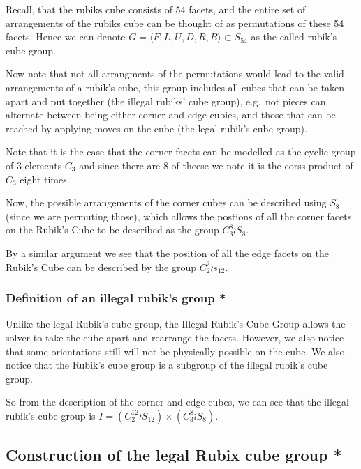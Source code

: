 Recall, that the rubiks cube consists of \(54\) facets, and the entire
set of arrangements of the rubiks cube can be thought of as permutations
of these 54 facets. Hence we can denote
\(G = \langle F,L,U,D,R,B\rangle \subset S_{54}\) as the called rubik's
cube group.

Now note that not all arrangments of the permutations would lead to the
valid arrangements of a rubik's cube, this group includes all cubes that
can be taken apart and put together (the illegal rubiks' cube group),
e.g.~not pieces can alternate between being either corner and edge
cubies, and those that can be reached by applying moves on the cube (the
legal rubik's cube group).

Note that it is the case that the corner facets can be modelled as the
cyclic group of 3 elements \(C_{3}\) and since there are 8 of theese we
note it is the corss product of \(C_{3}\) eight times.

Now, the possible arrangements of the corner cubes can be described
using \(S_{8}\) (since we are permuting those), which allows the
postions of all the corner facets on the Rubik's Cube to be described as
the group \(C_{3}^{8} \wr S_{8}\).

By a similar argument we see that the position of all the edge facets on
the Rubik's Cube can be described by the group \(C_{2}^{2} \wr s_{12}\).

\subsubsection{Definition of an illegal rubik's group
*}\label{definition-of-an-illegal-rubiks-group}

Unlike the legal Rubik's cube group, the Illegal Rubik's Cube Group
allows the solver to take the cube apart and rearrange the facets.
However, we also notice that some orientations still will not be
physically possible on the cube. We also notice that the Rubik's cube
group is a subgroup of the illegal rubik's cube group.

So from the description of the corner and edge cubes, we can see that
the illegal rubik's cube group is
\(I = (C^{12}_2 \wr S_{12}) \times (C^8_3 \wr S_8)\).

\subsection{Construction of the legal Rubix cube group
*}\label{construction-of-the-legal-rubix-cube-group}

